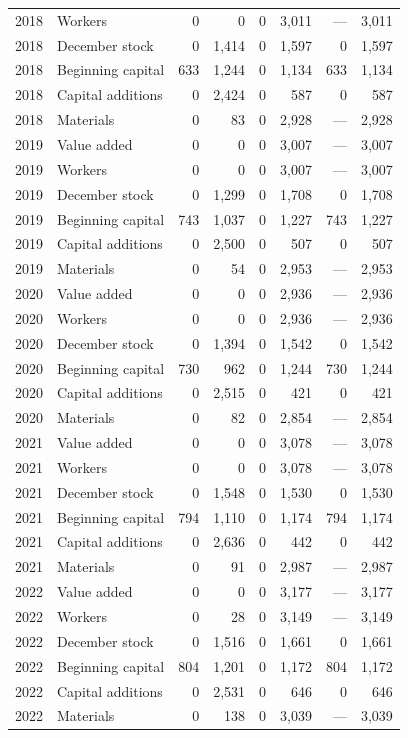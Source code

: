\begin{longtable}{llrrrrrr}
2018 & Workers & 0 & 0 & 0 & 3,011 & --- & 3,011 \\
2018 & December stock & 0 & 1,414 & 0 & 1,597 & 0 & 1,597 \\
2018 & Beginning capital & 633 & 1,244 & 0 & 1,134 & 633 & 1,134 \\
2018 & Capital additions & 0 & 2,424 & 0 & 587 & 0 & 587 \\
2018 & Materials & 0 & 83 & 0 & 2,928 & --- & 2,928 \\
2019 & Value added & 0 & 0 & 0 & 3,007 & --- & 3,007 \\
2019 & Workers & 0 & 0 & 0 & 3,007 & --- & 3,007 \\
2019 & December stock & 0 & 1,299 & 0 & 1,708 & 0 & 1,708 \\
2019 & Beginning capital & 743 & 1,037 & 0 & 1,227 & 743 & 1,227 \\
2019 & Capital additions & 0 & 2,500 & 0 & 507 & 0 & 507 \\
2019 & Materials & 0 & 54 & 0 & 2,953 & --- & 2,953 \\
2020 & Value added & 0 & 0 & 0 & 2,936 & --- & 2,936 \\
2020 & Workers & 0 & 0 & 0 & 2,936 & --- & 2,936 \\
2020 & December stock & 0 & 1,394 & 0 & 1,542 & 0 & 1,542 \\
2020 & Beginning capital & 730 & 962 & 0 & 1,244 & 730 & 1,244 \\
2020 & Capital additions & 0 & 2,515 & 0 & 421 & 0 & 421 \\
2020 & Materials & 0 & 82 & 0 & 2,854 & --- & 2,854 \\
2021 & Value added & 0 & 0 & 0 & 3,078 & --- & 3,078 \\
2021 & Workers & 0 & 0 & 0 & 3,078 & --- & 3,078 \\
2021 & December stock & 0 & 1,548 & 0 & 1,530 & 0 & 1,530 \\
2021 & Beginning capital & 794 & 1,110 & 0 & 1,174 & 794 & 1,174 \\
2021 & Capital additions & 0 & 2,636 & 0 & 442 & 0 & 442 \\
2021 & Materials & 0 & 91 & 0 & 2,987 & --- & 2,987 \\
2022 & Value added & 0 & 0 & 0 & 3,177 & --- & 3,177 \\
2022 & Workers & 0 & 28 & 0 & 3,149 & --- & 3,149 \\
2022 & December stock & 0 & 1,516 & 0 & 1,661 & 0 & 1,661 \\
2022 & Beginning capital & 804 & 1,201 & 0 & 1,172 & 804 & 1,172 \\
2022 & Capital additions & 0 & 2,531 & 0 & 646 & 0 & 646 \\
2022 & Materials & 0 & 138 & 0 & 3,039 & --- & 3,039 \\
\end{longtable}
